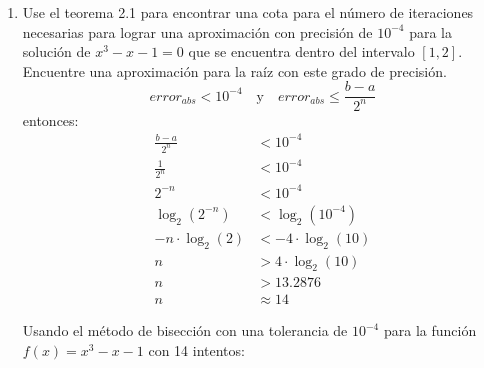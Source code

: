 \documentclass[12pt]{article}
\begin{document}
\begin{enumerate}       
    \item Use el teorema 2.1 para encontrar una cota para el número de iteraciones necesarias para lograr una
    aproximación con precisión de \(10^{-4}\) para la solución de \(x^{3} -x -1 = 0\) que se encuentra dentro del intervalo
    \([1, 2]\). Encuentre una aproximación para la raíz con este grado de precisión.
    \[ error_{abs} < 10^{-4}\quad \text{y} \quad error_{abs} \leq \frac{b-a}{2^{n}}\]
    entonces: 
    \[
        \begin{aligned}
            \frac{b-a}{2^{n}} &< 10^{-4} \\
            \frac{1}{2^{n}} &< 10^{-4} \\
            2^{-n} &< 10^{-4}\\
            \log_{2}{(2^{-n})} &<  \log_{2}{(10^{-4})}\\
            -n \cdot \log_{2}{(2)} &< -4 \cdot \log_{2}{(10)} \\
            n &> 4 \cdot \log_{2}{(10)} \\
            n &> 13.2876 \\
            n &\approx 14
        \end{aligned}
    \]

    Usando el método de bisección con una tolerancia de \(10^{-4}\) para la función \(f(x) = x^{3} -x -1\) con 14 intentos:
    

\end{enumerate}
\end{document}
